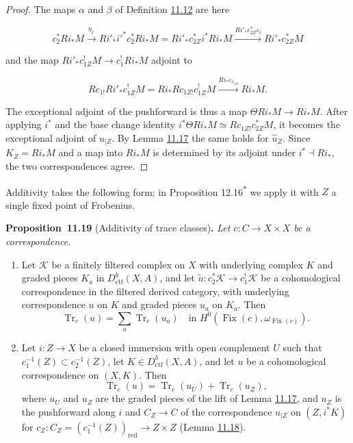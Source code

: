 \documentclass[11pt]{article}
\newenvironment{bpstatement}[2]{\par\addvspace{0.6\baselineskip}\noindent\textbf{#1}#2\textbf{.}\enspace\ignorespaces}
  {\par\addvspace{0.4\baselineskip}}
\newenvironment{bpstatementit}[2]{\begin{bpstatement}{#1}{#2}\itshape\ignorespaces}{\end{bpstatement}}
\newcommand{\bpout}[1]{#1\textsuperscript{\hyperlink{bp-outside}{\ensuremath{\ast}}}}
\providecommand{\Fix}{}\renewcommand{\Fix}{\operatorname{Fix}}
\begin{document}
\begin{proof}[{Proof}]\label{bp52}%
The maps \(\alpha\) and \(\beta\) of Definition \hyperref[bp35]{11.12} are here

\[
c_2^*Ri_*M\xrightarrow{\eta_{i'}}
Ri'_*i'^*c_2^*Ri_*M
=Ri'_*c_{2Z}^*i^*Ri_*M
\xrightarrow{Ri'_*c_{2Z}^*\varepsilon_i}Ri'_*c_{2Z}^*M
\]

and the map \(Ri'_*c_{1Z}^!M\to c_1^!Ri_*M\) adjoint to

\[
Rc_{1!}Ri'_*c_{1Z}^!M
=Ri_*Rc_{1Z!}c_{1Z}^!M\xrightarrow{Ri_*\varepsilon_{c_{1Z}}}Ri_*M.
\]

The exceptional adjoint of the pushforward is thus a map \(\Theta Ri_*M\to Ri_*M\). After applying \(i^*\) and the base change identity \(i^*\Theta Ri_*M\simeq Rc_{1Z!}c_{2Z}^*M\), it becomes the exceptional adjoint of \(u_{|Z}\). By Lemma \hyperref[bp48]{11.17} the same holds for \(\widehat u_Z\). Since \(K_Z=Ri_*M\) and a map into \(Ri_*M\) is determined by its adjoint under \(i^*\dashv Ri_*\), the two correspondences agree.
\end{proof}

\label{bp53}%
Additivity takes the following form; in Proposition \bpout{12.16} we apply it with \(Z\) a single fixed point of Frobenius.

\label{bp54}%
\begin{bpstatementit}{Proposition~11.19}{ (Additivity of trace classes)}
Let \(c:C\to X\times X\) be a correspondence.

\begin{enumerate}
\item Let \(\mathcal K\) be a finitely filtered complex on \(X\) with underlying complex \(K\) and graded pieces \(K_a\) in \(D^b_{\mathrm{ctf}}(X,A)\), and let \(\tilde u:c_2^*\mathcal K\to c_1^!\mathcal K\) be a cohomological correspondence in the filtered derived category, with underlying correspondence \(u\) on \(K\) and graded pieces \(u_a\) on \(K_a\). Then \[
   \operatorname{Tr}_c(u)=\sum_a\operatorname{Tr}_c(u_a)
   \quad\text{in }H^0(\Fix(c),\omega_{\Fix(c)}).
   \]
\item Let \(i:Z\to X\) be a closed immersion with open complement \(U\) such that \(c_1^{-1}(Z)\subset c_2^{-1}(Z)\), let \(K\in D^b_{\mathrm{ctf}}(X,A)\), and let \(u\) be a cohomological correspondence on \((X,K)\). Then \[
   \operatorname{Tr}_c(u)=\operatorname{Tr}_c(u_U)+\operatorname{Tr}_c(u_Z),
   \] where \(u_U\) and \(u_Z\) are the graded pieces of the lift of Lemma \hyperref[bp48]{11.17}, and \(u_Z\) is the pushforward along \(i\) and \(C_Z\to C\) of the correspondence \(u_{|Z}\) on \((Z,i^*K)\) for \(c_Z:C_Z=(c_1^{-1}(Z))_{\mathrm{red}}\to
Z\times Z\) (Lemma \hyperref[bp51]{11.18}).
\end{enumerate}
\end{bpstatementit}
\end{document}

